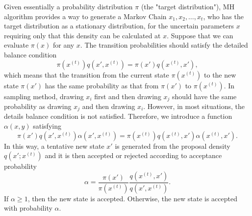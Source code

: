 Given essentially a probability distribution $\pi$ (the "target distribution"), MH algorithm provides a way to generate a Markov Chain $x_1, x_2,\ldots, x_t$, who has the target distribution as a stationary distribution, for the uncertain parameters $x$ requiring only that this density can be calculated at $x$. Suppose that we can evaluate $\pi(x)$ for any $x$. The transition probabilities should satisfy the detailed balance condition
\begin{equation*}
\pi(x^{(t)})q(x', x^{(t)}) = \pi(x')q(x^{(t)}, x'),
\end{equation*}
which means that the transition from the current state $\pi(x^{(t)})$ to the new state $\pi(x')$ has the same probability as that 
from $\pi(x')$ to $\pi(x^{(t)})$. In sampling method, drawing $x_i$ first and then drawing $x_j$ should have the same probability as drawing $x_j$ and then drawing $x_i$. However, in most situations, the details balance condition is not satisfied. Therefore, we introduce a function $\alpha(x,y)$ satisfying 
\begin{equation*}
\pi(x')q(x', x^{(t)})\alpha(x',x^{(t)}) = \pi(x^{(t)})q(x^{(t)}, x')\alpha(x^{(t)},x').
\end{equation*}
In this way, a tentative new state $x'$ is generated from the proposal density $q(x';x^{(t)})$ and it is then accepted or rejected according to acceptance probability 
\begin{equation}\label{alphabalance}
\alpha=\frac{\pi(x')}{\pi(x^{(t)})}\frac{q(x^{(t)}, x')}{q(x', x^{(t)})}.
\end{equation}
If $\alpha \geq 1$, then the new state is accepted. Otherwise, the new state is accepted with probability $\alpha$.



